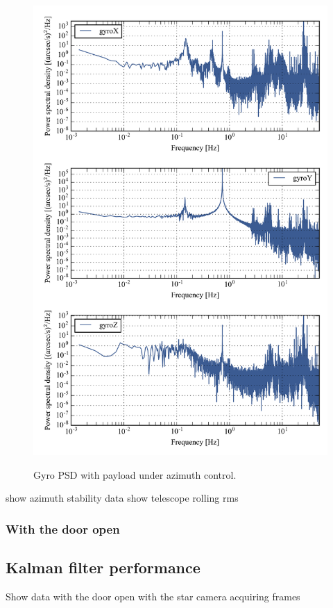 \begin{figure}[!h]
\begin{center}
\includegraphics{Figures/multiPSD100.png}
\label{fig:multiPSD100_controlled}
\caption[Gyro PSD with payload lifted, under azimuth control]{Gyro PSD with payload under azimuth control.}
\end{center}
\end{figure}


 show azimuth stability data
show telescope rolling rms
\subsubsection{With the door open}
\subsection{Kalman filter performance}
Show data with the door open with the star camera acquiring frames
